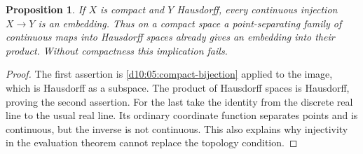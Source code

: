 \documentclass[11pt,oneside,openany]{book}
\newtheorem{proposition}[theorem]{Proposition}
\theoremstyle{definition}
\theoremstyle{remark}
\begin{document}
\begin{proposition}\label{d10:10:compact-point-separation}
If $X$ is compact and $Y$ Hausdorff, every continuous injection $X\to Y$ is an embedding. Thus on a compact space a point-separating family of continuous maps into Hausdorff spaces already gives an embedding into their product. Without compactness this implication fails.
\end{proposition}
\begin{proof}
The first assertion is \cref{d10:05:compact-bijection} applied to the image, which is Hausdorff as a subspace. The product of Hausdorff spaces is Hausdorff, proving the second assertion. For the last take the identity from the discrete real line to the usual real line. Its ordinary coordinate function separates points and is continuous, but the inverse is not continuous. This also explains why injectivity in the evaluation theorem cannot replace the topology condition.
\end{proof}
\end{document}
